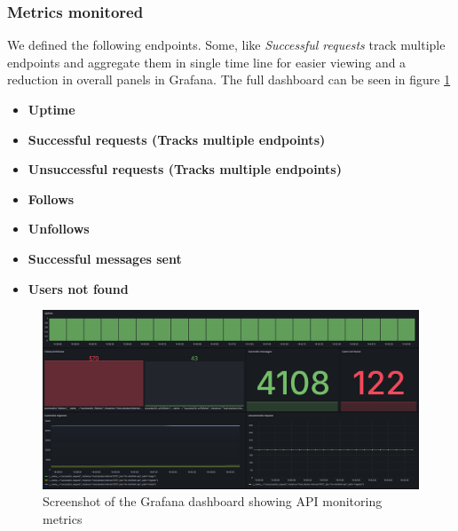 \subsubsection{Metrics monitored}
We defined the following endpoints. Some, like \textit{Successful requests} track multiple endpoints and aggregate them in single time line for easier viewing and a reduction in overall panels in Grafana. The full dashboard can be seen in figure \ref{fig:dashboard}
\begin{itemize}
    \item \textbf{Uptime}
    \item \textbf{Successful requests (Tracks multiple endpoints)}
    \item \textbf{Unsuccessful requests (Tracks multiple endpoints)}
    \item \textbf{Follows}
    \item \textbf{Unfollows}
    \item \textbf{Successful messages sent}
    \item \textbf{Users not found}
\end{itemize}

\begin{figure} [!htb]
    \centering
    \includegraphics[width=1.0\linewidth]{Images/Grafana_dashboard.png}
    \caption{Screenshot of the Grafana dashboard showing API monitoring metrics}
    \label{fig:dashboard}
\end{figure}

